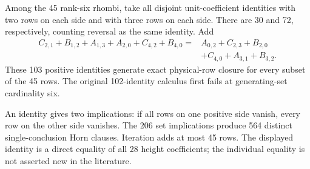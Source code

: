 \begin{theorem}\label{thm:closure-calculus}
Among the 45 rank-six rhombi, take all disjoint unit-coefficient identities
with two rows on each side and with three rows on each side. There are 30
and 72, respectively, counting reversal as the same identity. Add
\begin{align*}
C_{2,1}+B_{1,2}+A_{1,3}+A_{2,0}+C_{4,2}+B_{4,0}
={}&A_{0,2}+C_{2,3}+B_{2,0}\\
&+C_{4,0}+A_{3,1}+B_{3,2}.
\end{align*}
These 103 positive identities generate exact physical-row closure for every
subset of the 45 rows. The original 102-identity calculus first fails at
generating-set cardinality six.
\end{theorem}

An identity gives two implications: if all rows on one positive side vanish,
every row on the other side vanishes. The 206 set implications produce 564
distinct single-conclusion Horn clauses. Iteration adds at most 45 rows.
The displayed identity is a direct equality of all 28 height coefficients;
the individual equality is not asserted new in the literature.

